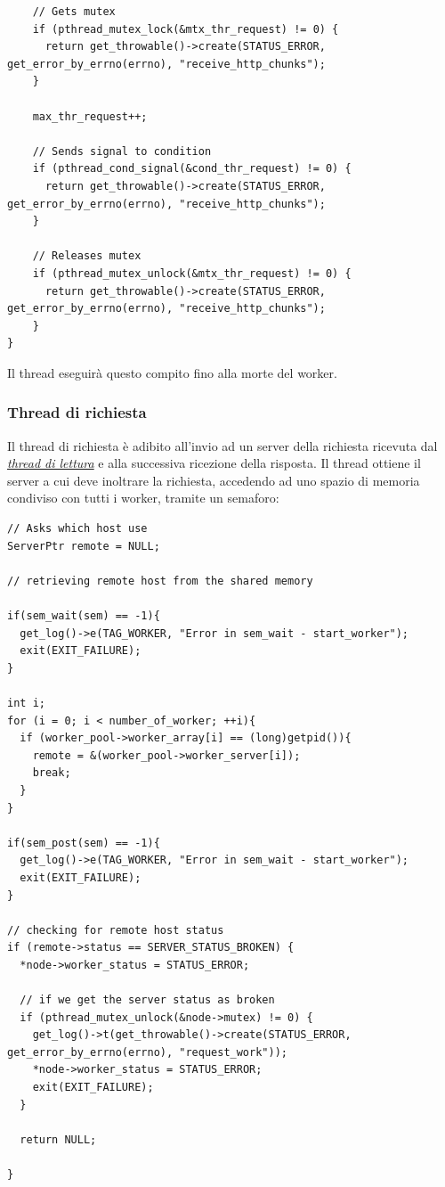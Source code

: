 \documentclass[italian]{tktltiki2}
\begin{document}
\begin{lstlisting}
    // Gets mutex
    if (pthread_mutex_lock(&mtx_thr_request) != 0) {
      return get_throwable()->create(STATUS_ERROR, get_error_by_errno(errno), "receive_http_chunks");
    }

    max_thr_request++;

    // Sends signal to condition
    if (pthread_cond_signal(&cond_thr_request) != 0) {
      return get_throwable()->create(STATUS_ERROR, get_error_by_errno(errno), "receive_http_chunks");
    }

    // Releases mutex
    if (pthread_mutex_unlock(&mtx_thr_request) != 0) {
      return get_throwable()->create(STATUS_ERROR, get_error_by_errno(errno), "receive_http_chunks");
    }
}
\end{lstlisting}
Il thread eseguirà questo compito fino alla morte del worker.
\subsubsection{Thread di richiesta}
\label{sec:request}
Il thread di richiesta è adibito all'invio ad un server della richiesta ricevuta dal \hyperref[sec:request]{\emph{thread di lettura}} e alla successiva ricezione della risposta. Il thread ottiene il server a cui deve inoltrare la richiesta, accedendo ad uno spazio di memoria condiviso con tutti i worker, tramite un semaforo:
\begin{lstlisting}
// Asks which host use
ServerPtr remote = NULL;

// retrieving remote host from the shared memory

if(sem_wait(sem) == -1){
  get_log()->e(TAG_WORKER, "Error in sem_wait - start_worker");
  exit(EXIT_FAILURE);
}

int i;
for (i = 0; i < number_of_worker; ++i){
  if (worker_pool->worker_array[i] == (long)getpid()){
    remote = &(worker_pool->worker_server[i]);
    break;
  }
}

if(sem_post(sem) == -1){
  get_log()->e(TAG_WORKER, "Error in sem_wait - start_worker");
  exit(EXIT_FAILURE);
}

// checking for remote host status
if (remote->status == SERVER_STATUS_BROKEN) {
  *node->worker_status = STATUS_ERROR;

  // if we get the server status as broken
  if (pthread_mutex_unlock(&node->mutex) != 0) {
    get_log()->t(get_throwable()->create(STATUS_ERROR, get_error_by_errno(errno), "request_work"));
    *node->worker_status = STATUS_ERROR;
    exit(EXIT_FAILURE);
  }

  return NULL;

}
\end{lstlisting}
\end{document}
